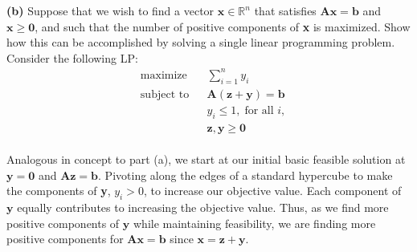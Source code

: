 \documentclass{article}
\begin{document}
\noindent
\textbf{(b)} Suppose that we wish to find a vector $\mathbf{x} \in \mathbb{R}^n$ that satisfies $\mathbf{Ax = b}$ and $\mathbf{x \geq 0}$, and such that the number of positive components of \textbf{x} is maximized.  Show how this can be accomplished by solving a single linear programming problem. \\

\noindent
Consider the following LP:
\begin{equation*}
\begin{aligned}
& \text{maximize} &&\displaystyle \sum_{i=1}^n y_i \\
& \text{subject to} &&\mathbf{A(z+y)=b} \\
&&&					y_i \leq 1, \; \text{for all } i,\\
&&&					\mathbf{z,y \geq 0}
\end{aligned}
\end{equation*} \\

\noindent
Analogous in concept to part (a), we start at our initial basic feasible solution at $\mathbf{y=0}$ and $\mathbf{Az=b}$.  Pivoting along the edges of a standard hypercube to make the components of \textbf{y}, $y_i > 0$, to increase our objective value.  Each component of $\textbf{y}$ equally contributes to increasing the objective value.  Thus, as we find more positive components of $\mathbf{y}$ while maintaining feasibility, we are finding more positive components for $\mathbf{Ax=b}$ since $\mathbf{x = z + y}$.
\end{document}
